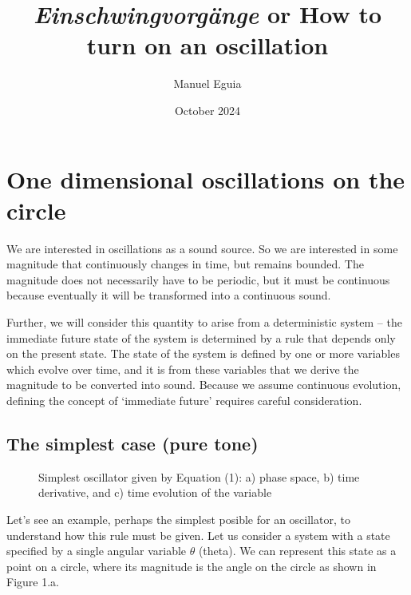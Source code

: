 \documentclass{article}
\title{{\em Einschwingvorgänge} or How to turn on an oscillation}
\author{Manuel Eguia}
\date{October 2024}
\begin{document}
\maketitle

\section{One dimensional oscillations on the circle}
We are interested in oscillations as a sound source. So we are interested in some magnitude that continuously changes in time, but remains bounded. The magnitude does not necessarily have to be periodic, but it must be continuous because eventually it will be transformed into a continuous sound.

Further, we will consider this quantity to arise from a deterministic system -- the immediate future state of the system is determined by a rule that depends only on the present state. The state of the system is defined by one or more variables which evolve over time, and it is from these variables that we derive the magnitude to be converted into sound. Because we assume continuous evolution, defining the concept of `immediate future' requires careful consideration.



\subsection{The simplest case (pure tone)}

\begin{figure} [h]
    \centering
    \caption{Simplest oscillator given by Equation (1): a) phase space, b) time derivative, and c) time evolution of the variable} 
    \label{fig_pure}
\end{figure}

Let's see an example, perhaps the simplest posible for an oscillator, to understand how this rule must be given. 
Let us consider a system with a state specified by a single angular variable $\theta$ (theta). 
We can represent this state as a point on a circle, where its magnitude is the angle on the circle as shown in Figure 1.a.
\end{document}
